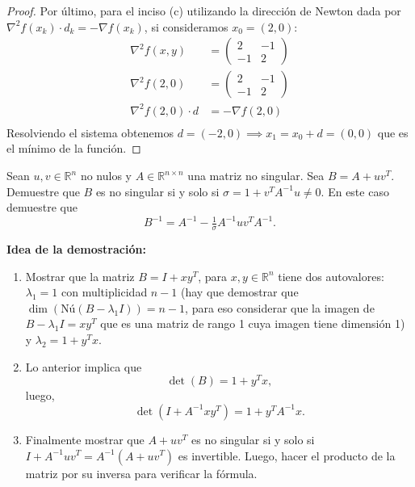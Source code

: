 \documentclass{article}
\newenvironment{theorem}[2][Ejercicio]{\begin{trivlist}
\item[\hskip \labelsep {\bfseries #1}\hskip \labelsep {\bfseries #2.}]}{\end{trivlist}}
\begin{document}
\begin{proof}
    Por último, para el inciso (c) utilizando la dirección de Newton dada por \( \nabla^2 f(x_k) \cdot d_k = - \nabla f(x_k) \), si consideramos \( x_0 = (2,0) \): \begin{align*}
        \nabla^2 f(x,y)          & = \begin{pmatrix}
                                         2  & -1 \\
                                         -1 & 2
                                     \end{pmatrix}   \\
        \nabla^2 f(2,0)          & = \begin{pmatrix}
                                         2  & -1 \\
                                         -1 & 2
                                     \end{pmatrix}   \\
        \nabla^2 f(2, 0) \cdot d & = - \nabla f(2, 0) \\
    \end{align*}
    Resolviendo el sistema obtenemos \( d = (-2, 0) \implies x_1 = x_0 + d = (0, 0) \) que es el mínimo de la función.
\end{proof}

\vspace{0.25in}

\begin{theorem}{7}
    Sean \(u, v \in \mathbb{R}^n\) no nulos y \(A \in \mathbb{R}^{n \times n}\) una matriz no singular.
    Sea \( B = A + u v^T \). Demuestre que \(B\) es no singular si y solo si
    \(\sigma = 1 + v^T A^{-1} u \neq 0\). En este caso demuestre que
    \[
        B^{-1} = A^{-1} - \tfrac{1}{\sigma} A^{-1} u v^T A^{-1}.
    \]

    \textbf{Idea de la demostración:}
    \begin{enumerate}
        \item[(a)] Mostrar que la matriz \(B = I + xy^T\), para \(x,y \in \mathbb{R}^n\)
              tiene dos autovalores: \(\lambda_1 = 1\) con multiplicidad \(n-1\)
              (hay que demostrar que \(\dim(\text{Nú}(B - \lambda_1 I)) = n-1\),
              para eso considerar que la imagen de \(B - \lambda_1 I = xy^T\) que es una matriz de rango 1
              cuya imagen tiene dimensión 1) y \(\lambda_2 = 1 + y^T x\).

        \item[(b)] Lo anterior implica que
              \[
                  \det(B) = 1 + y^T x,
              \]
              luego,
              \[
                  \det(I + A^{-1} x y^T) = 1 + y^T A^{-1} x.
              \]

        \item[(c)] Finalmente mostrar que \(A + uv^T\) es no singular si y solo si
              \(I + A^{-1} u v^T = A^{-1} (A + uv^T)\) es invertible.
              Luego, hacer el producto de la matriz por su inversa para verificar la fórmula.
    \end{enumerate}
\end{theorem}
\end{document}
